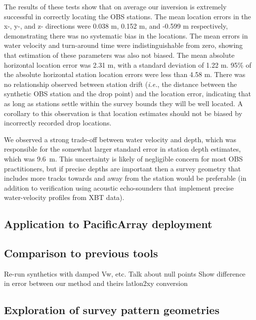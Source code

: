 The results of these tests show that on average our inversion is extremely successful in correctly locating the OBS stations. The mean location errors in the x-, y-, and z- directions were 0.038 m, 0.152 m, and -0.599 m respectively, demonstrating there was no systematic bias in the locations. The mean errors in water velocity and turn-around time were indistinguishable from zero, showing that estimation of these parameters was also not biased. The mean absolute horizontal location error was 2.31 m, with a standard deviation of 1.22 m. 95\% of the absolute horizontal station location errors were less than 4.58 m. There was no relationship observed between station drift (\textit{i.e.}, the distance between the synthetic OBS station and the drop point) and the location error, indicating that as long as stations settle within the survey bounds they will be well located. A corollary to this observation is that location estimates should not be biased by incorrectly recorded drop locations. 

We observed a strong trade-off between water velocity and depth, which was responsible for the somewhat larger standard error in station depth estimates, which was \mbox{9.6 m}. This uncertainty is likely of negligible concern for most OBS practitioners, but if precise depths are important then a survey geometry that includes more tracks towards and away from the station would be preferable (in addition to verification using acoustic echo-sounders that implement precise water-velocity profiles from XBT data).

\subsection{Application to PacificArray deployment}



\subsection{Comparison to previous tools}
Re-run synthetics with damped Vw, etc.
Talk about null points
Show difference in error between our method and theirs
latlon2xy conversion


\subsection{Exploration of survey pattern geometries} \label{sec:surv_geom_tests}